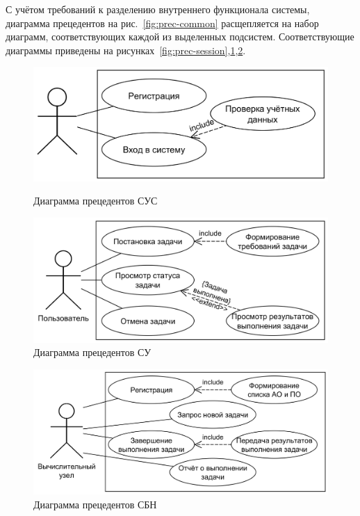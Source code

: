 \documentclass[a4paper,12pt]{report}
\numberwithin{equation}{section}
\begin{document}
С учётом требований к разделению внутреннего функционала системы, диаграмма прецедентов на рис.~\ref{fig:prec-common}
расщепляется на набор диаграмм, соответствующих каждой из выделенных подсистем.
Соответствующие диаграммы приведены на рисунках~\ref{fig:prec-session},\ref{fig:prec-logic},\ref{fig:prec-balancer}.

\begin{figure}  
  \centering
  \begin{minipage}{.49\linewidth}
    \centering
    \includegraphics[width=\linewidth]{diagrams/session/usecase}
    \caption{Диаграмма прецедентов СУС}
    \label{fig:prec-session}
  \end{minipage}
  \hfill
  \begin{minipage}{.49\linewidth}
    \centering
    \includegraphics[width=\linewidth]{diagrams/logic/usecase}
    \caption{Диаграмма прецедентов СУ}
    \label{fig:prec-logic}
  \end{minipage}  
\end{figure}

\begin{figure}
  \centering
  \includegraphics[width=.6\linewidth]{diagrams/balancer/usecase}
  \caption{Диаграмма прецедентов СБН}
  \label{fig:prec-balancer}
\end{figure}
\end{document}
